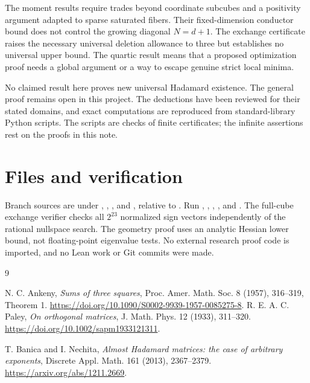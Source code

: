 \documentclass[11pt]{article}
\begin{document}
The moment results require trades beyond coordinate subcubes and a
positivity argument adapted to sparse saturated fibers. Their
fixed-dimension conductor bound does not control the growing diagonal
$N=d+1$. The exchange certificate raises the necessary universal
deletion allowance to three but establishes no universal upper bound.
The quartic result means that a proposed optimization proof needs a
global argument or a way to escape genuine strict local minima.

No claimed result here proves new universal Hadamard existence. The
general proof remains open in this project. The deductions have been
reviewed for their stated domains, and exact computations are reproduced
from standard-library Python scripts. The scripts are checks of finite
certificates; the infinite assertions rest on the proofs in this note.

\section{Files and verification}
Branch sources are under , ,
, and , relative to
. Run
, ,
, , and
. The full-cube exchange verifier checks all
$2^{23}$ normalized sign vectors independently of the rational
nullspace search. The geometry proof uses an analytic Hessian lower
bound, not floating-point eigenvalue tests. No external research
proof code is imported, and no Lean work or Git commits were made.

\begin{thebibliography}{9}
\small\raggedright

 N. C. Ankeny, \emph{Sums of three squares},
Proc. Amer. Math. Soc. 8 (1957), 316--319, Theorem 1.
\url{https://doi.org/10.1090/S0002-9939-1957-0085275-8}.
 R. E. A. C. Paley, \emph{On orthogonal matrices},
J. Math. Phys. 12 (1933), 311--320.
\url{https://doi.org/10.1002/sapm1933121311}.

 T. Banica and I. Nechita,
\emph{Almost Hadamard matrices: the case of arbitrary exponents},
Discrete Appl. Math. 161 (2013), 2367--2379.
\url{https://arxiv.org/abs/1211.2669}.
\end{thebibliography}
\end{document}
